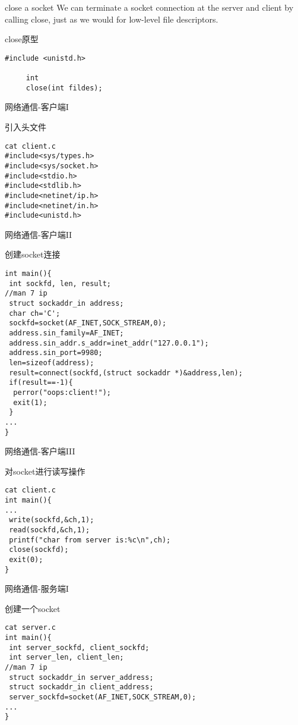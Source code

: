 \documentclass{beamer}
\begin{document}
\begin{frame}[fragile]{close a socket}
We can terminate a socket connection at the server and client by calling close, just as we would for low-level file descriptors. 
\begin{block}{close原型}
\begin{verbatim}
#include <unistd.h>

     int
     close(int fildes);
\end{verbatim}
\end{block}
\end{frame}
\begin{frame}[fragile]{网络通信-客户端I}
\begin{block}{引入头文件}
\begin{verbatim}
cat client.c 
#include<sys/types.h>
#include<sys/socket.h>
#include<stdio.h>
#include<stdlib.h>
#include<netinet/ip.h>
#include<netinet/in.h>
#include<unistd.h>

\end{verbatim}
\end{block}
\end{frame}

\begin{frame}[fragile]{网络通信-客户端II}
\begin{block}{创建socket连接}
\begin{verbatim}
int main(){
 int sockfd, len, result;
//man 7 ip
 struct sockaddr_in address;
 char ch='C';
 sockfd=socket(AF_INET,SOCK_STREAM,0);
 address.sin_family=AF_INET;
 address.sin_addr.s_addr=inet_addr("127.0.0.1");
 address.sin_port=9980;
 len=sizeof(address);
 result=connect(sockfd,(struct sockaddr *)&address,len);
 if(result==-1){
  perror("oops:client!");
  exit(1);
 }
...
}

\end{verbatim}
\end{block}
\end{frame}
\begin{frame}[fragile]{网络通信-客户端III}
\begin{block}{对socket进行读写操作}
\begin{verbatim}
cat client.c 
int main(){
...	
 write(sockfd,&ch,1);
 read(sockfd,&ch,1);
 printf("char from server is:%c\n",ch);
 close(sockfd);
 exit(0);
}
\end{verbatim}
\end{block}
\end{frame}

\begin{frame}[fragile]{网络通信-服务端I}
\begin{block}{创建一个socket}
\begin{verbatim}
cat server.c
int main(){
 int server_sockfd, client_sockfd;
 int server_len, client_len;
//man 7 ip
 struct sockaddr_in server_address;
 struct sockaddr_in client_address;
 server_sockfd=socket(AF_INET,SOCK_STREAM,0);
...
}

\end{verbatim}
\end{block}
\end{frame}
\end{document}
